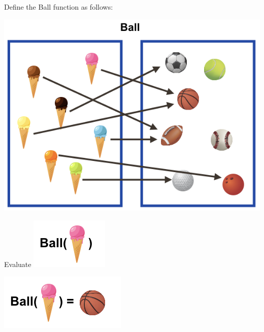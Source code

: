 \documentclass{ximera}
\begin{document}
Define the Ball function as follows: 
\begin{image}
\includegraphics{pics/func_ball.png}
\end{image}

\begin{question}
Evaluate \includegraphics{pics/Q_1.png}
\begin{multipleChoice}
\end{multipleChoice}
\begin{feedback}
\includegraphics{pics/A_1.png}
\end{feedback}
\end{question}
\end{document}
